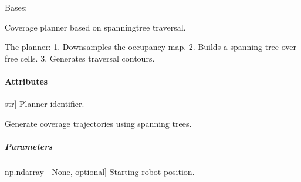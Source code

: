 \documentclass[letterpaper,10pt,english]{sphinxmanual}
\begin{document}
\begin{fulllineitems}
\label{\detokenize{mirte_lc_nav2.navigators:mirte_lc_nav2.navigators.SpanningTreePath}}
\pysigstartsignatures
\pysiglinewithargsret
{}
{\sphinxparamcomma {}\sphinxparamcomma {}}
{}
\pysigstopsignatures
\sphinxAtStartPar
Bases: {\hyperref[\detokenize{mirte_lc_nav2.navigator_types:mirte_lc_nav2.navigator_types.SystematicNavigator}]{}}

\sphinxAtStartPar
Coverage planner based on spanning\sphinxhyphen{}tree traversal.

\sphinxAtStartPar
The planner:
1. Downsamples the occupancy map.
2. Builds a spanning tree over free cells.
3. Generates traversal contours.


\paragraph{Attributes}
\label{\detokenize{mirte_lc_nav2.navigators:id18}}\begin{description}
\sphinxlineitem{name}{[}str{]}
\sphinxAtStartPar
Planner identifier.

\end{description}

\begin{fulllineitems}
\label{\detokenize{mirte_lc_nav2.navigators:mirte_lc_nav2.navigators.SpanningTreePath.generate_path}}
\pysigstartsignatures
\pysiglinewithargsret
{}
{}
{}
\pysigstopsignatures
\sphinxAtStartPar
Generate coverage trajectories using spanning trees.


\subparagraph{Parameters}
\label{\detokenize{mirte_lc_nav2.navigators:id19}}\begin{description}
\sphinxlineitem{start}{[}np.ndarray | None, optional{]}
\sphinxAtStartPar
Starting robot position.


\end{description}
\end{fulllineitems}
\end{fulllineitems}
\end{document}
